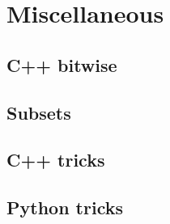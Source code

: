 \section{Miscellaneous}
\subsection{C++ bitwise}
\raggedbottom
\hrulefill
\subsection{Subsets}
\raggedbottom
\hrulefill
\subsection{C++ tricks}
\raggedbottom
\hrulefill
\subsection{Python tricks}
\raggedbottom
\hrulefill


